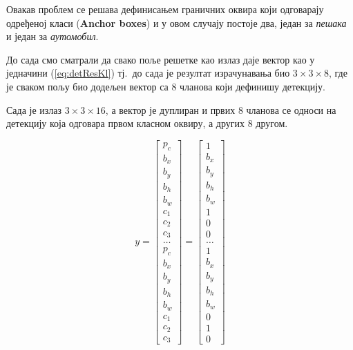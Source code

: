 \documentclass[12pt, а4paper]{article}
\begin{document}
Овакав проблем се решава дефинисањем граничних оквира који
одговарају одређеној класи (\textbf{Anchor boxes}) и у овом случају постоје
два, један за \textit{пешака} и један за \textit{аутомобил}.

До сада смо сматрали да свако поље решетке као излаз даје вектор као у
једначини (\ref{eq:detResKl}) тј.\ до сада је резултат израчунавања био
$3 \times 3 \times 8$, где је сваком пољу био додељен вектор са 8 чланова
који дефинишу детекцију.

Сада је излаз $3 \times 3 \times 16$, а вектор је дуплиран и првих 8
чланова се односи на детекцију која одговара првом класном оквиру,
а других 8 другом.

\begin{equation}
y =
\begin{bmatrix}
 p_c \\
 b_x \\
 b_y \\
 b_h \\
 b_w \\
 c_1 \\
 c_2 \\
 c_3 \\
 \dots \\
 p_c \\
 b_x \\
 b_y \\
 b_h \\
 b_w \\
 c_1 \\
 c_2 \\
 c_3
\end{bmatrix}
=
\begin{bmatrix}
 1 \\
 b_x \\
 b_y \\
 b_h \\
 b_w \\
 1 \\
 0 \\
 0 \\
 \dots \\
 1 \\
 b_x \\
 b_y \\
 b_h \\
 b_w \\
 0 \\
 1 \\
 0
\end{bmatrix}
\label{eq:anchor1}
\end{equation}
\end{document}
